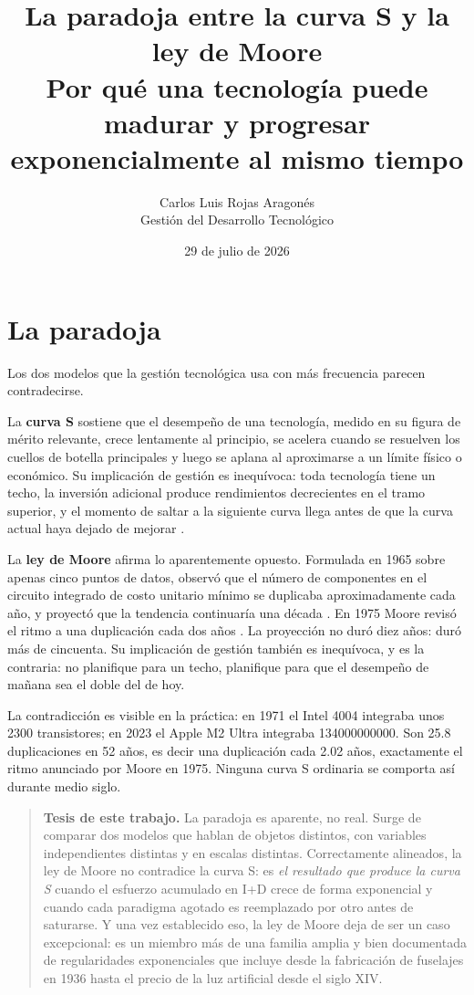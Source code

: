 \documentclass[11pt,letterpaper]{article}
\title{\textbf{La paradoja entre la curva S y la ley de Moore}\\
\large Por qué una tecnología puede madurar y progresar exponencialmente al
mismo tiempo}
\author{Carlos Luis Rojas Aragonés\\
Gestión del Desarrollo Tecnológico}
\date{29 de julio de 2026}
\begin{document}
\maketitle

\section{La paradoja}

Los dos modelos que la gestión tecnológica usa con más frecuencia parecen
contradecirse.

La \textbf{curva S} sostiene que el desempeño de una tecnología, medido en su
figura de mérito relevante, crece lentamente al principio, se acelera cuando se
resuelven los cuellos de botella principales y luego se aplana al aproximarse a
un límite físico o económico. Su implicación de gestión es inequívoca: toda
tecnología tiene un techo, la inversión adicional produce rendimientos
decrecientes en el tramo superior, y el momento de saltar a la siguiente curva
llega antes de que la curva actual haya dejado de mejorar
\parencite{foster1986}.

La \textbf{ley de Moore} afirma lo aparentemente opuesto. Formulada en 1965 sobre
apenas cinco puntos de datos, observó que el número de componentes en el circuito
integrado de costo unitario mínimo se duplicaba aproximadamente cada año, y
proyectó que la tendencia continuaría una década \parencite{moore1965}. En 1975
Moore revisó el ritmo a una duplicación cada dos años \parencite{moore1975}. La
proyección no duró diez años: duró más de cincuenta. Su implicación de gestión
también es inequívoca, y es la contraria: no planifique para un techo, planifique
para que el desempeño de mañana sea el doble del de hoy.

La contradicción es visible en la práctica: en 1971 el Intel 4004 integraba unos
\num{2300} transistores; en 2023 el Apple M2 Ultra integraba
\num{134000000000}. Son \num{25.8} duplicaciones en \num{52} años, es decir una
duplicación cada \num{2.02} años, exactamente el ritmo anunciado por Moore en
1975. Ninguna curva S ordinaria se comporta así durante medio siglo.

\begin{quote}
\textbf{Tesis de este trabajo.} La paradoja es aparente, no real. Surge de
comparar dos modelos que hablan de objetos distintos, con variables
independientes distintas y en escalas distintas. Correctamente alineados, la ley
de Moore no contradice la curva S: es \emph{el resultado que produce la curva S}
cuando el esfuerzo acumulado en I+D crece de forma exponencial y cuando cada
paradigma agotado es reemplazado por otro antes de saturarse. Y una vez
establecido eso, la ley de Moore deja de ser un caso excepcional: es un miembro
más de una familia amplia y bien documentada de regularidades exponenciales que
incluye desde la fabricación de fuselajes en 1936 hasta el precio de la luz
artificial desde el siglo XIV.
\end{quote}
\end{document}
